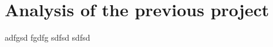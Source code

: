 \chapter{Analysis of the previous project}

adfgsd fgdfg\cite{reportreviewer} sdfsd\cite{nextjsssrssg} sdfsd\cite{typescripthomepage}
